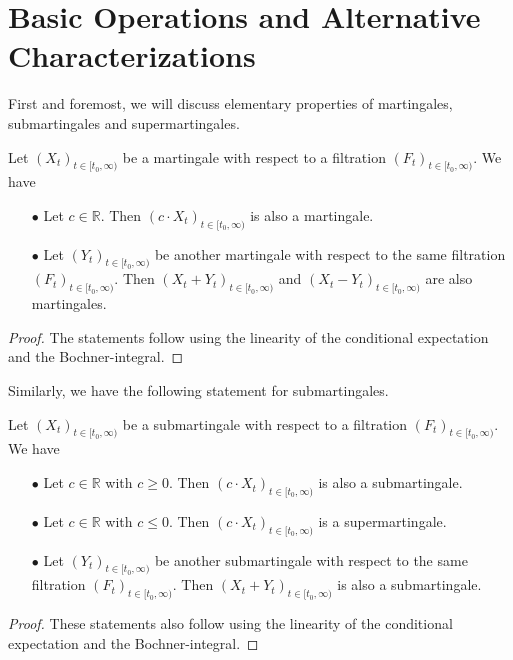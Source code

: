 \section{Basic Operations and Alternative Characterizations}

First and foremost, we will discuss elementary properties of martingales, submartingales and supermartingales. 

\begin{lemma}
	Let $(X_t)_{t \in [t_0,\infty)}$ be a martingale with respect to a filtration $(F_t)_{t \in [t_0,\infty)}$. We have
	\begin{enumerate}
	\item[$\bullet$] Let $c \in \mathbb{R}$. Then $(c \cdot X_t)_{t \in [t_0,\infty)}$ is also a martingale.
	\item[$\bullet$] Let $(Y_t)_{t \in [t_0,\infty)}$ be another martingale with respect to the same filtration $(F_t)_{t \in [t_0,\infty)}$. Then $(X_t + Y_t)_{t \in [t_0,\infty)}$ and $(X_t - Y_t)_{t \in [t_0,\infty)}$ are also martingales.
	\end{enumerate}
\end{lemma}
\begin{proof}
	The statements follow using the linearity of the conditional expectation and the Bochner-integral.
\end{proof}

Similarly, we have the following statement for submartingales.

\begin{lemma}
	Let $(X_t)_{t \in [t_0,\infty)}$ be a submartingale with respect to a filtration $(F_t)_{t \in [t_0,\infty)}$. We have
	\begin{enumerate}
	\item[$\bullet$] Let $c \in \mathbb{R}$ with $c \ge 0$. Then $(c \cdot X_t)_{t \in [t_0,\infty)}$ is also a submartingale.
	\item[$\bullet$] Let $c \in \mathbb{R}$ with $c \le 0$. Then $(c \cdot X_t)_{t \in [t_0,\infty)}$ is a supermartingale.
	\item[$\bullet$] Let $(Y_t)_{t \in [t_0,\infty)}$ be another submartingale with respect to the same filtration $(F_t)_{t \in [t_0,\infty)}$. Then $(X_t + Y_t)_{t \in [t_0,\infty)}$ is also a submartingale.
	\end{enumerate}
\end{lemma}
\begin{proof}
	These statements also follow using the linearity of the conditional expectation and the Bochner-integral.
\end{proof}

